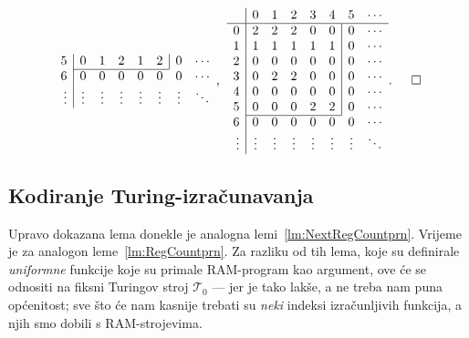 \begin{primjer}[{name=[kodirana tablica prijelaza]}]
\begin{equation*}
\begin{array}{r|ccccccc}
5& 0 & 1 & 2 & 1 & 2 & \multicolumn{1}{|c}{0} & \cdots\\ \cline{2-6}
6& 0 & 0 & 0 & 0 & 0 & 0 & \cdots\\
\vdots&\vdots&\vdots&\vdots&\vdots&\vdots&\vdots&\ddots
\end{array}\text,\;\;
\begin{array}{r|ccccccc}
    &0&1&2&3&4&5&\cdots\\\hline
0& 2 & 2 & 2 & 0 & 0 & \multicolumn{1}{|c}{0} & \cdots\\
1& 1 & 1 & 1 & 1 & 1 & \multicolumn{1}{|c}{0} & \cdots\\
2& 0 & 0 & 0 & 0 & 0 & \multicolumn{1}{|c}{0} & \cdots\\
3& 0 & 2 & 2 & 0 & 0 & \multicolumn{1}{|c}{0} & \cdots\\
4& 0 & 0 & 0 & 0 & 0 & \multicolumn{1}{|c}{0} & \cdots\\
5& 0 & 0 & 0 & 2 & 2 & \multicolumn{1}{|c}{0} & \cdots\\ \cline{2-6}
6& 0 & 0 & 0 & 0 & 0 & 0 & \cdots\\
\vdots&\vdots&\vdots&\vdots&\vdots&\vdots&\vdots&\ddots
\end{array}\text.\!\!\!\qedhere
\end{equation*}
\end{primjer}

\subsection{Kodiranje Turing-izračunavanja}

Upravo dokazana lema donekle je analogna lemi~\ref{lm:NextRegCountprn}. Vrijeme je za analogon leme~\ref{lm:RegCountprn}. Za razliku od tih lema, koje su definirale \emph{uniformne} funkcije koje su primale RAM-program kao argument, ove će se odnositi na fiksni Turingov stroj $\mathcal T_0$ --- jer je tako lakše, a ne treba nam puna općenitost; sve što će nam kasnije trebati su \emph{neki} indeksi izračunljivih funkcija, a njih smo dobili s RAM-strojevima.

